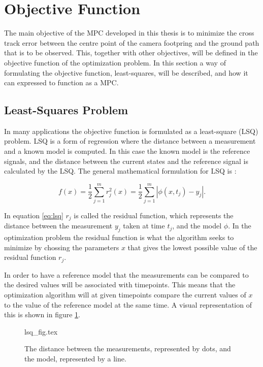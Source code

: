 \section{Objective Function}
\label{ch:objective_function}

The main objective of the MPC developed in this thesis is to minimize the cross track error between the centre point of the camera footpring and the ground path that is to be observed. This, together with other objectives, will be defined in the objective function of the optimization problem. In this section a way of formulating the objective function, least-squares, will be described, and how it can expressed to function as a MPC.


\subsection{Least-Squares Problem}

In many applications the objective function is formulated as a least-square (LSQ) problem. LSQ is a form of regression where the distance between a measurement and a known model is computed. In this case the known model is the reference signals, and the distance between the current states and the reference signal is calculated by the LSQ. The general mathematical formulation for LSQ is \cite{nocedalOPTIMIZATION}:

\begin{equation}
	\label{eq:lsq}
	f(x) = \frac{1}{2} \sum_{j=1}^m r_j^2(x) = \frac{1}{2} \sum_{j=1}^m |\phi(x, t_j) - y_j|.
\end{equation}

In equation \ref{eq:lsq} $r_j$ is called the residual function, which represents the distance between the measurement $y_j$ taken at time $t_j$, and the model $\phi$. In the optimization problem the residual function is what the algorithm seeks to minimize by chossing the parameters $x$ that gives the lowest possible value of the residual function $r_j$.

In order to have a reference model that the measurements can be compared to the desired values will be associated with timepoints. This means that the optimization algorithm will at given timepoints compare the current values of $x$ to the value of the reference model at the same time. A visual representation of this is shown in figure \ref{fig:lsq}.

\begin{figure}
	{lsq_fig.tex}
	\caption{The distance between the measurements, represented by dots, and the model, represented by a line.}
	\label{fig:lsq}
\end{figure}


